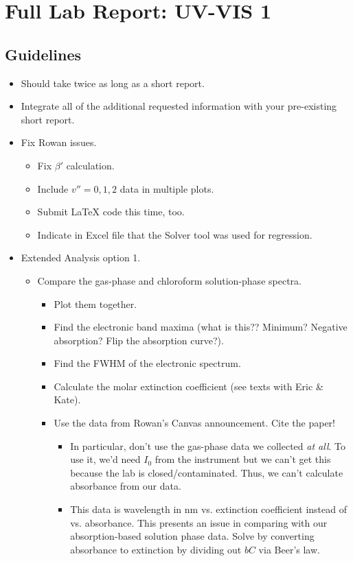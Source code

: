 \documentclass[../notes.tex]{subfiles}
\begin{document}
\section{Full Lab Report: UV-VIS 1}
\subsection*{Guidelines}
\begin{itemize}
    \item {}Should take twice as long as a short report.
    \item Integrate all of the additional requested information with your pre-existing short report.
    \item Fix Rowan issues.
    \begin{itemize}
        \item Fix $\beta'$ calculation.
        \item Include $v''=0,1,2$ data in multiple plots.
        \item Submit LaTeX code this time, too.
        \item Indicate in Excel file that the Solver tool was used for regression.
    \end{itemize}
    \item Extended Analysis option 1.
    \begin{itemize}
        \item Compare the gas-phase and chloroform solution-phase  spectra.
        \begin{itemize}
            \item Plot them together.
            \item Find the electronic band maxima (what is this?? Minimum? Negative absorption? Flip the absorption curve?).
            \item Find the FWHM of the electronic spectrum.
            \item Calculate the molar extinction coefficient (see texts with Eric \& Kate).
            \item Use the data from Rowan's Canvas announcement. Cite the paper!
            \begin{itemize}
                \item In particular, don't use the gas-phase  data we collected \emph{at all}. To use it, we'd need $I_0$ from the instrument but we can't get this because the lab is closed/contaminated. Thus, we can't calculate absorbance from our data.
                \item This data is wavelength in nm vs. extinction coefficient instead of vs. absorbance. This presents an issue in comparing with our absorption-based solution phase data. Solve by converting absorbance to extinction by dividing out $bC$ via Beer's law.

\end{itemize}
\end{itemize}
\end{itemize}
\end{itemize}
\end{document}
